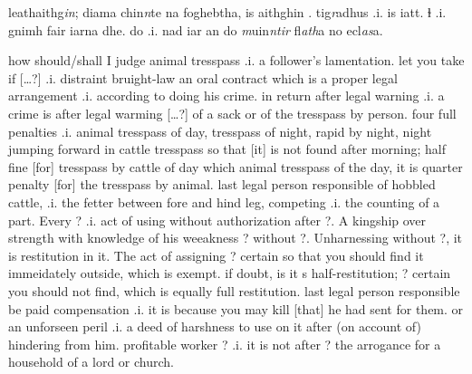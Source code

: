 \documentclass[11pt]{article}
\begin{document}
\begin{pages}
\begin{Leftside}
leathaithg\emph{in}; diama chin\emph{n}te na foghebtha, is aithghin .   tig\emph{r}adhus .i. is    iatt. ɫ  .i. gnimh   fair iarna  dhe.  do  .i. nad iar  an  do \emph{m}uin\emph{ntir} fl\emph{ath}a no ecl\emph{as}a. 
    \pend
  \endnumbering
  \end{Leftside}

 \begin{Rightside}
    \beginnumbering\pstart  
    how should/shall I judge animal tresspass .i. a follower's lamentation.  let you take if [\ldots?] .i. distraint bruight-law an oral contract which is a proper legal arrangement .i. according to doing his crime.  in return after legal warning .i. a crime is after legal warming [\ldots?] of a sack or of the tresspass by person.  four full penalties .i. animal tresspass of day, tresspass of night, rapid by night, night jumping forward in cattle tresspass so that [it] is not found after morning;  half fine [for] tresspass by cattle of day which animal tresspass of the day, it is quarter penalty [for] the tresspass by animal.  last legal person responsible of hobbled cattle, .i. the fetter between fore and hind leg, competing .i. the counting of a part. Every ? .i. act of using without authorization after ?. A kingship over strength with knowledge of his weeakness ? without ?.  Unharnessing without ?, it is restitution in it.  The act of assigning ? certain so that you should find it immeidately outside, which is exempt.  if doubt, is it s half-restitution; ? certain you should not find, which is equally full restitution.  last legal person responsible be paid compensation .i. it is because you may kill [that] he had sent for them.  or an unforseen peril .i. a deed of harshness to use on it after (on account of) hindering from him. profitable worker ? .i. it is not after ? the arrogance for a household of a lord or church.
    \pend
    \endnumbering
  \end{Rightside}

  \Pages
\end{pages}
\end{document}
